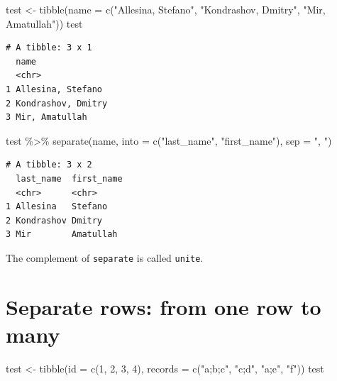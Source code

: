 \documentclass[
  letterpaper,
  DIV=11,
  numbers=noendperiod]{scrreprt}
\newenvironment{Shaded}{\begin{snugshade}}{\end{snugshade}}
\newcommand{\AttributeTok}[1]{\textcolor[rgb]{0.40,0.45,0.13}{#1}}
\newcommand{\DecValTok}[1]{\textcolor[rgb]{0.68,0.00,0.00}{#1}}
\newcommand{\FunctionTok}[1]{\textcolor[rgb]{0.28,0.35,0.67}{#1}}
\newcommand{\NormalTok}[1]{\textcolor[rgb]{0.00,0.23,0.31}{#1}}
\newcommand{\OtherTok}[1]{\textcolor[rgb]{0.00,0.23,0.31}{#1}}
\newcommand{\SpecialCharTok}[1]{\textcolor[rgb]{0.37,0.37,0.37}{#1}}
\newcommand{\StringTok}[1]{\textcolor[rgb]{0.13,0.47,0.30}{#1}}
\begin{document}
\begin{Shaded}
\begin{Highlighting}[]
\NormalTok{test }\OtherTok{\textless{}{-}} \FunctionTok{tibble}\NormalTok{(}\AttributeTok{name =} \FunctionTok{c}\NormalTok{(}\StringTok{"Allesina, Stefano"}\NormalTok{, }\StringTok{"Kondrashov, Dmitry"}\NormalTok{, }\StringTok{"Mir, Amatullah"}\NormalTok{))}
\NormalTok{test}
\end{Highlighting}
\end{Shaded}

\begin{verbatim}
# A tibble: 3 x 1
  name              
  <chr>             
1 Allesina, Stefano 
2 Kondrashov, Dmitry
3 Mir, Amatullah    
\end{verbatim}

\begin{Shaded}
\begin{Highlighting}[]
\NormalTok{test }\SpecialCharTok{\%\textgreater{}\%} \FunctionTok{separate}\NormalTok{(name, }\AttributeTok{into =} \FunctionTok{c}\NormalTok{(}\StringTok{"last\_name"}\NormalTok{, }\StringTok{"first\_name"}\NormalTok{), }\AttributeTok{sep =} \StringTok{", "}\NormalTok{)}
\end{Highlighting}
\end{Shaded}

\begin{verbatim}
# A tibble: 3 x 2
  last_name  first_name
  <chr>      <chr>     
1 Allesina   Stefano   
2 Kondrashov Dmitry    
3 Mir        Amatullah 
\end{verbatim}

The complement of \texttt{separate} is called \texttt{unite}.

\hypertarget{separate-rows-from-one-row-to-many}{%
\section{Separate rows: from one row to
many}\label{separate-rows-from-one-row-to-many}}

\begin{Shaded}
\begin{Highlighting}[]
\NormalTok{test }\OtherTok{\textless{}{-}} \FunctionTok{tibble}\NormalTok{(}\AttributeTok{id =} \FunctionTok{c}\NormalTok{(}\DecValTok{1}\NormalTok{, }\DecValTok{2}\NormalTok{, }\DecValTok{3}\NormalTok{, }\DecValTok{4}\NormalTok{), }\AttributeTok{records =} \FunctionTok{c}\NormalTok{(}\StringTok{"a;b;c"}\NormalTok{, }\StringTok{"c;d"}\NormalTok{, }\StringTok{"a;e"}\NormalTok{, }\StringTok{"f"}\NormalTok{))}
\NormalTok{test}
\end{Highlighting}
\end{Shaded}
\end{document}
